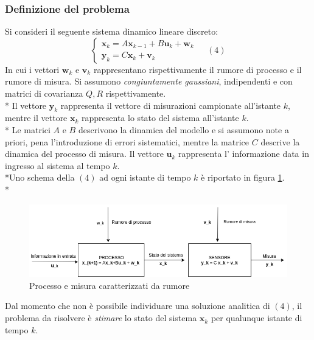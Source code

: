 \subsubsection{Definizione del problema}
Si consideri il seguente sistema dinamico lineare discreto:
$$
\begin{cases}
\mathbf x_k = A \mathbf x_{k-1} + B \mathbf u_k + \mathbf w_k \\
\mathbf y_k = C \mathbf x_k + \mathbf v_k
\end{cases}\;\;\;\;(4)
$$
In cui i vettori $\mathbf w_k$ e $\mathbf v_k$ rappresentano rispettivamente il rumore di processo e il rumore di misura. Si assumono \emph{congiuntamente gaussiani}, indipendenti e con matrici di covarianza $Q,R$ rispettivamente.\\*
Il vettore $\mathbf y_k$ rappresenta il vettore di misurazioni campionate all'istante $k$, mentre il vettore $\mathbf x_k$ rappresenta lo stato del sistema all'istante $k$.\\*
Le matrici $A$ e $B$ descrivono la dinamica del modello e si assumono note a priori, pena l'introduzione di errori sistematici, mentre la matrice $C$ descrive la dinamica del processo di misura. Il vettore $\mathbf u_k$ rappresenta l' informazione data in ingresso al sistema al tempo $k$. \cite{lkf}\\*Uno schema della $(4)$ ad ogni istante di tempo $k$ \`e riportato in figura \ref{fig:mimo2}.\\*
\begin{figure}[t]
	\centering
	\includegraphics[width=\linewidth]{img/mimo2}
	\caption{Processo e misura caratterizzati da rumore}
	\label{fig:mimo2}
\end{figure}
Dal momento che non \`e possibile individuare una soluzione analitica di $(4)$, il problema da risolvere \`e \emph{stimare} lo stato del sistema $\mathbf{x}_k$ per qualunque istante di tempo $k$.
